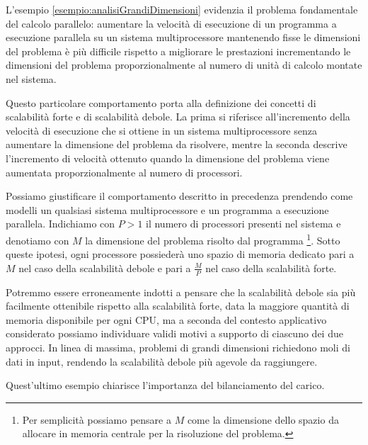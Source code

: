 L'esempio \ref{esempio:analisiGrandiDimensioni} evidenzia il problema fondamentale del calcolo parallelo: aumentare la velocit\`a di esecuzione
di un programma a esecuzione parallela su un sistema multiprocessore mantenendo fisse le dimensioni del problema \`e pi\`u difficile rispetto a migliorare
le prestazioni incrementando le dimensioni del problema proporzionalmente al numero di unit\`a di calcolo montate nel sistema.

Questo particolare comportamento porta alla definizione dei concetti di scalabilit\`a forte e di scalabilit\`a debole.\newline
La prima si riferisce all'incremento della velocit\`a di esecuzione che si ottiene in un sistema multiprocessore senza aumentare la dimensione del problema da
risolvere, mentre la seconda descrive l'incremento di velocit\`a ottenuto quando la dimensione del problema viene aumentata proporzionalmente al numero
di processori.

Possiamo giustificare il comportamento descritto in precedenza prendendo come modelli un qualsiasi sistema multiprocessore e un programma a esecuzione parallela.\newline
Indichiamo con $P > 1$ il numero di processori presenti nel
sistema e denotiamo con $M$ la dimensione del problema risolto dal programma \footnote{Per semplicit\`a possiamo pensare a $M$ come la dimensione dello spazio da allocare in memoria centrale per la
    risoluzione del problema.}.\newline
Sotto queste ipotesi, ogni processore possieder\`a uno spazio di memoria dedicato pari a $M$ nel caso della scalabilit\`a debole e pari a $\frac{M}{P}$ nel
caso della scalabilit\`a forte.

Potremmo essere erroneamente indotti a pensare che la scalabilit\`a debole sia pi\`u facilmente ottenibile rispetto alla scalabilit\`a forte, data la maggiore quantit\`a di memoria disponibile per ogni CPU, ma a seconda
del contesto applicativo considerato possiamo individuare validi motivi a supporto di ciascuno dei due approcci.\newline
In linea di massima, problemi di grandi
dimensioni richiedono moli di dati in input, rendendo la scalabilit\`a debole pi\`u agevole da raggiungere.

Quest'ultimo esempio chiarisce l'importanza del bilanciamento del carico.

